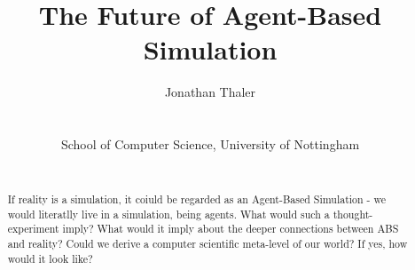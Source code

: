 \documentclass[a4paper, 10pt, conference]{../../templates/IEEEconf/IEEEconf}
\title{The Future of Agent-Based Simulation}
\author{
	Jonathan Thaler \\
	\email{jonathan.thaler@nottingham.ac.uk} \\
	\begin{affiliation}
		School of Computer Science, University of Nottingham
	\end{affiliation} \\
}
\begin{document}
\maketitle

\begin{abstract}

If reality is a simulation, it coiuld be regarded as an Agent-Based Simulation - we would literatlly live in a simulation, being agents. What would such a thought-experiment imply? What would it imply about the deeper connections between ABS and reality? Could we derive a computer scientific meta-level of our world? If yes, how would it look like? 
\end{abstract}











\end{document}
